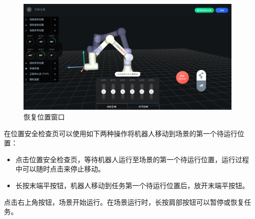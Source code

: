 \begin{figure}[ht]
	\centering
	\includegraphics[width=\textwidth]{image/07/图3.17 恢复位置窗口.png}
	\caption{恢复位置窗口}
	\label{fig:位置安全检查页}
\end{figure}

在位置安全检查页可以使用如下两种操作将机器人移动到场景的第一个待运行位置：
\begin{itemize}
	\item 点击位置安全检查页，等待机器人运行至场景的第一个待运行位置，运行过程中可以随时点击来停止移动。
	\item 长按末端平按钮，机器人移动到任务第一个待运行位置后，放开末端平按钮。
\end{itemize}

点击右上角按钮，场景开始运行。在场景运行时，长按肩部按钮可以暂停或恢复任务。




